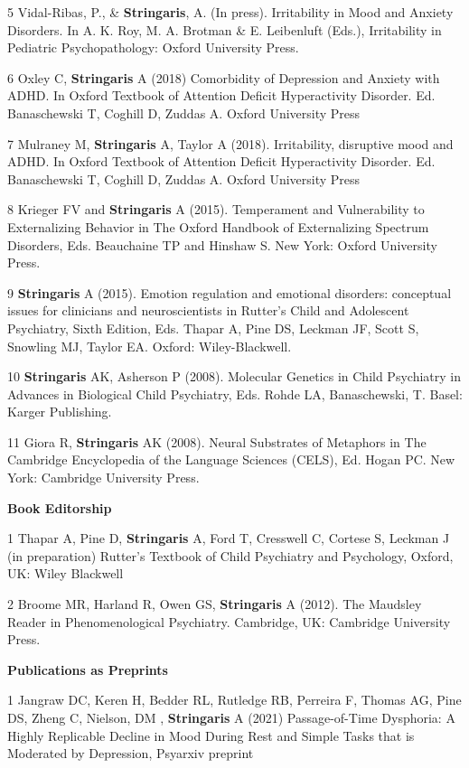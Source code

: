 \documentclass[
]{article}
\begin{document}
5 Vidal-Ribas, P., \& \textbf{Stringaris}, A. (In press). Irritability
in Mood and Anxiety Disorders. In A. K. Roy, M. A. Brotman \& E.
Leibenluft (Eds.), Irritability in Pediatric Psychopathology: Oxford
University Press.

6 Oxley C, \textbf{Stringaris} A (2018) Comorbidity of Depression and
Anxiety with ADHD. In Oxford Textbook of Attention Deficit Hyperactivity
Disorder. Ed. Banaschewski T, Coghill D, Zuddas A. Oxford University
Press

7 Mulraney M, \textbf{Stringaris} A, Taylor A (2018). Irritability,
disruptive mood and ADHD. In Oxford Textbook of Attention Deficit
Hyperactivity Disorder. Ed. Banaschewski T, Coghill D, Zuddas A. Oxford
University Press

8 Krieger FV and \textbf{Stringaris} A (2015). Temperament and
Vulnerability to Externalizing Behavior in The Oxford Handbook of
Externalizing Spectrum Disorders, Eds. Beauchaine TP and Hinshaw S. New
York: Oxford University Press.

9 \textbf{Stringaris} A (2015). Emotion regulation and emotional
disorders: conceptual issues for clinicians and neuroscientists in
Rutter's Child and Adolescent Psychiatry, Sixth Edition, Eds. Thapar A,
Pine DS, Leckman JF, Scott S, Snowling MJ, Taylor EA. Oxford:
Wiley-Blackwell.

10 \textbf{Stringaris} AK, Asherson P (2008). Molecular Genetics in
Child Psychiatry in Advances in Biological Child Psychiatry, Eds. Rohde
LA, Banaschewski, T. Basel: Karger Publishing.

11 Giora R, \textbf{Stringaris} AK (2008). Neural Substrates of
Metaphors in The Cambridge Encyclopedia of the Language Sciences (CELS),
Ed. Hogan PC. New York: Cambridge University Press.

\textbf{Book Editorship}

1 Thapar A, Pine D, \textbf{Stringaris} A, Ford T, Cresswell C, Cortese
S, Leckman J (in preparation) Rutter's Textbook of Child Psychiatry and
Psychology, Oxford, UK: Wiley Blackwell

2 Broome MR, Harland R, Owen GS, \textbf{Stringaris} A (2012). The
Maudsley Reader in Phenomenological Psychiatry. Cambridge, UK: Cambridge
University Press.

\textbf{Publications as Preprints}

1 Jangraw DC, Keren H, Bedder RL, Rutledge RB, Perreira F, Thomas AG,
Pine DS, Zheng C, Nielson, DM , \textbf{Stringaris} A (2021)
Passage-of-Time Dysphoria: A Highly Replicable Decline in Mood During
Rest and Simple Tasks that is Moderated by Depression, Psyarxiv preprint
\end{document}
